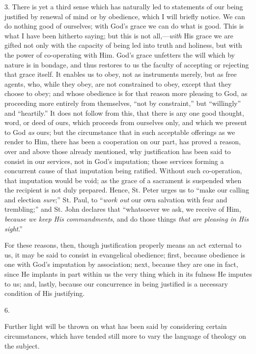 3. There is yet a third sense which has naturally led to statements
of our being justified by renewal of mind or by obedience, which I
will briefly notice. We can do nothing good of ourselves; with God's
grace we can do what is good. This is what I have been hitherto
saying; but this is not all,—\emph{with} His grace we are gifted not
only with the capacity of being led into truth and holiness, but with
the power of co-operating with Him. God's grace unfetters the will
which by nature is in bondage, and thus restores to us the faculty of
accepting or rejecting that grace itself. It enables us to obey, not
as instruments merely, but as free agents, who, while they obey, are
not constrained to obey, except that they choose to obey; and whose
obedience is for that reason more pleasing to God, as proceeding more
entirely from themselves, ``not by constraint,'' but
``willingly'' and ``heartily.'' It does not follow
from this, that there is any one good thought, word, or deed of ours,
which proceeds from ourselves only, and which we present to God \emph{as}
ours; but the circumstance that in such acceptable offerings as we
render to Him, there has been a cooperation on our part, has
proved a reason, over and above those already mentioned, why
justification has been said to consist in our services, not in God's
imputation; those services forming a concurrent cause of that
imputation being ratified. Without such co-operation, that imputation
would be void; as the grace of a sacrament is suspended when the
recipient is not duly prepared. Hence, St. Peter urges us to
``make our calling and election \emph{sure};'' St. Paul, to
``\emph{work out} our own salvation with fear and trembling;''
and St. John declares that ``whatsoever we ask, we receive of Him,
\emph{because we keep His commandments}, and do those things \emph{that
are pleasing in His sight}.''

For these reasons, then, though justification properly means an act
external to us, it may be said to consist in evangelical obedience;
first, because obedience is one with God's imputation by association;
next, because they are one in fact, since He implants in part within
us the very thing which in its fulness He imputes to us; and, lastly,
because our concurrence in being justified is a necessary condition of
His justifying.

6.

Further light will be thrown on what has been said by considering
certain circumstances, which have tended still more to vary the
language of theology on the subject.

